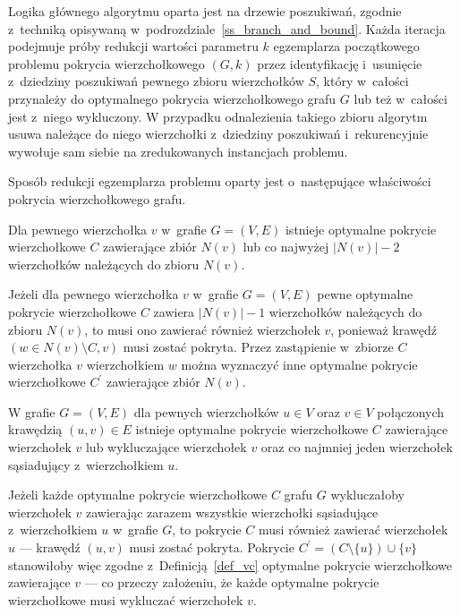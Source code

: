 \par{
  Logika głównego algorytmu oparta jest na drzewie poszukiwań, zgodnie z~techniką opisywaną w~podrozdziale~\ref{ss_branch_and_bound}.
  Każda iteracja podejmuje próby redukcji wartości parametru $k$ egzemplarza początkowego problemu pokrycia wierzchołkowego $(G, k)$ przez identyfikację i~usunięcie z~dziedziny poszukiwań pewnego zbioru wierzchołków $S$, który w~całości przynależy do optymalnego pokrycia wierzchołkowego grafu $G$ lub też w~całości jest z~niego wykluczony.
  W przypadku odnalezienia takiego zbioru algorytm usuwa należące do niego wierzchołki z~dziedziny poszukiwań i~rekurencyjnie wywołuje sam siebie na zredukowanych instancjach problemu.

  Sposób redukcji egzemplarza problemu oparty jest o~następujące właściwości pokrycia wierzchołkowego grafu.
  \begin{theorem}
    Dla pewnego wierzchołka $v$ w~grafie $G=(V, E)$ istnieje optymalne pokrycie wierzchołkowe $C$ zawierające zbiór $N(v)$ lub co najwyżej $|N(v)| - 2$ wierzchołków należących do zbioru $N(v)$.
  \end{theorem}
  \begin{bproof}
    Jeżeli dla pewnego wierzchołka $v$ w~grafie $G=(V, E)$ pewne optymalne pokrycie wierzchołkowe $C$ zawiera $|N(v)|-1$ wierzchołków należących do zbioru $N(v)$, to musi ono zawierać również wierzchołek $v$, ponieważ krawędź $(w \in N(v) \setminus C, v)$ musi zostać pokryta.
    Przez zastąpienie w~zbiorze $C$ wierzchołka $v$ wierzchołkiem $w$ można wyznaczyć inne optymalne pokrycie wierzchołkowe $C^\prime$ zawierające zbiór $N(v)$.
  \end{bproof}
  \begin{theorem}
     W grafie $G=(V, E)$ dla pewnych wierzchołków $u \in V$ oraz $v \in V$ połączonych krawędzią $(u, v) \in E$ istnieje optymalne pokrycie wierzchołkowe $C$ zawierające wierzchołek $v$ lub wykluczające wierzchołek $v$ oraz co najmniej jeden wierzchołek sąsiadujący z~wierzchołkiem $u$.
  \end{theorem}
  \begin{bproof}
    Jeżeli każde optymalne pokrycie wierzchołkowe $C$ grafu $G$ wykluczałoby wierzchołek $v$ zawierając zarazem wszystkie wierzchołki sąsiadujące z~wierzchołkiem $u$ w~grafie $G$, to pokrycie $C$ musi również zawierać wierzchołek $u$ --- krawędź $(u, v)$ musi zostać pokryta.
    Pokrycie $C^\prime=(C \setminus \{u\}) \cup \{v\}$ stanowiłoby więc zgodne z~Definicją~\ref{def_vc} optymalne pokrycie wierzchołkowe zawierające $v$ --- co przeczy założeniu, że każde optymalne pokrycie wierzchołkowe musi wykluczać wierzchołek $v$.

\end{bproof}}
